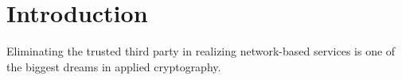 \section{Introduction}
Eliminating the trusted third party in realizing network-based services is one of the biggest dreams in applied cryptography.

